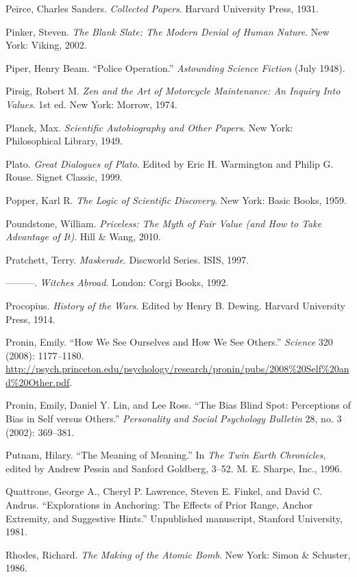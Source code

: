 {
 Peirce, Charles Sanders. \textit{Collected Papers}. Harvard
University Press, 1931.}

{
 Pinker, Steven. \textit{The Blank Slate: The Modern Denial of
Human Nature}. New York: Viking, 2002.}

{
 Piper, Henry Beam. ``Police
Operation.'' \textit{Astounding Science Fiction}
(July 1948).}

{
 Pirsig, Robert M. \textit{Zen and the Art of Motorcycle
Maintenance: An Inquiry Into Values}. 1st ed. New York: Morrow, 1974.}

{
 Planck, Max. \textit{Scientific Autobiography and Other Papers}.
New York: Philosophical Library, 1949.}

{
 Plato. \textit{Great Dialogues of Plato}. Edited by Eric H.
Warmington and Philip G. Rouse. Signet Classic, 1999.}

{
 Popper, Karl R. \textit{The Logic of Scientific Discovery}. New
York: Basic Books, 1959.}

{
 Poundstone, William. \textit{Priceless: The Myth of Fair Value
(and How to Take Advantage of It)}. Hill \& Wang, 2010.}

{
 Pratchett, Terry. \textit{Maskerade}. Discworld Series. ISIS,
1997.}

{
 {}---{}---{}---. \textit{Witches Abroad}. London: Corgi Books,
1992.}

{
 Procopius. \textit{History of the Wars}. Edited by Henry B.
Dewing. Harvard University Press, 1914.}

{
 Pronin, Emily. ``How We See Ourselves and How We
See Others.'' \textit{Science} 320 (2008):
1177--1180.
\url{http://psych.princeton.edu/psychology/research/pronin/pubs/2008\%20Self\%20and\%20Other.pdf}.}

{
 Pronin, Emily, Daniel Y. Lin, and Lee Ross. ``The
Bias Blind Spot: Perceptions of Bias in Self versus
Others.'' \textit{Personality and Social Psychology
Bulletin} 28, no. 3 (2002): 369--381.}

{
 Putnam, Hilary. ``The Meaning of
Meaning.'' In \textit{The Twin Earth Chronicles},
edited by Andrew Pessin and Sanford Goldberg, 3--52. M. E. Sharpe,
Inc., 1996.}

{
 Quattrone, George A., Cheryl P. Lawrence, Steven E. Finkel, and
David C. Andrus. ``Explorations in Anchoring: The
Effects of Prior Range, Anchor Extremity, and Suggestive
Hints.'' Unpublished manuscript, Stanford University,
1981.}

{
 Rhodes, Richard. \textit{The Making of the Atomic Bomb}. New York:
Simon \& Schuster, 1986.}

